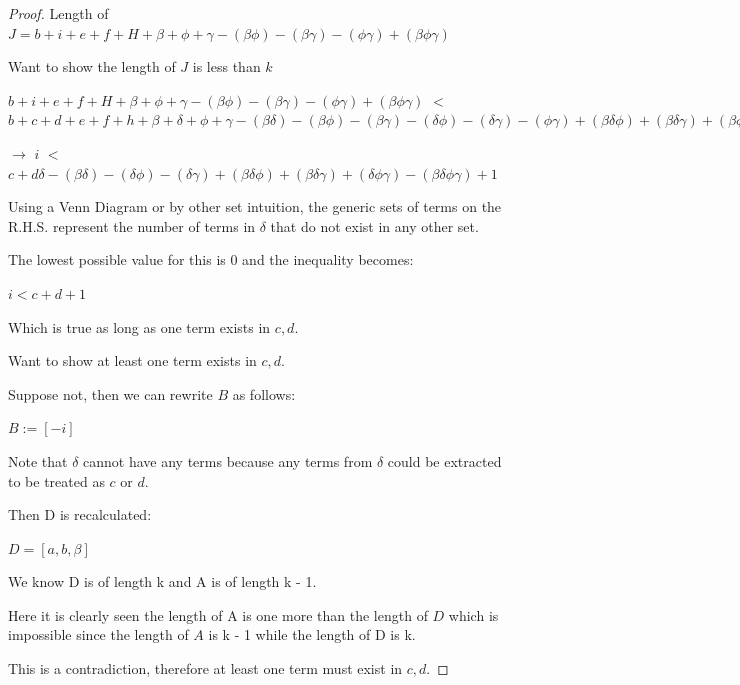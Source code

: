 \documentclass[manuscript]{acmart}
\begin{document}
\begin{proof}
        Length of $J = 
        b + i + e + f + H
        + \beta + \phi + \gamma
        - (\beta \phi) - (\beta \gamma) - (\phi \gamma)
        + (\beta \phi \gamma)
        $

        Want to show the length of $J$ is less than $k$

        $b + i + e + f + H
        + \beta + \phi + \gamma
        - (\beta \phi) - (\beta \gamma) - (\phi \gamma)
        + (\beta \phi \gamma)
        $
        $<$
        $b + c + d + e + f + h
        + \beta + \delta + \phi + \gamma
        - (\beta \delta) - (\beta \phi) - (\beta \gamma) - (\delta \phi) - (\delta \gamma) - (\phi \gamma)
        + (\beta \delta \phi) + (\beta \delta \gamma) + (\beta \phi \gamma) + (\delta \phi \gamma)
        - (\beta \delta \phi \gamma)
        + 1
        $

        $\rightarrow$
        $i
        $
        $<$
        $c + d
        \delta
        - (\beta \delta) - (\delta \phi) - (\delta \gamma)
        + (\beta \delta \phi) + (\beta \delta \gamma) + (\delta \phi \gamma)
        - (\beta \delta \phi \gamma)
        + 1
        $

        Using a Venn Diagram or by other set intuition, the generic sets
        of terms on the R.H.S. represent the number of terms in $\delta$
        that do not exist in any other set.

        The lowest possible value for this is 0 and the inequality becomes:

        $i < c + d + 1$

        Which is true as long as one term exists in {$c, d$}.

        Want to show at least one term exists in {$c, d$}.

        Suppose not, then we can rewrite $B$ as follows:

        $B := [-i]$

        Note that $\delta$ cannot have any terms because any terms from
        $\delta$ could be extracted to be treated as $c$ or $d$.

        Then D is recalculated:

        $D = [a, b, \beta]$

        We know D is of length k and A is of length k - 1.

        Here it is clearly seen the length of A is one more
        than the length of $D$ which is impossible since the 
        length of $A$ is k - 1 while the length of D is k.

        This is a contradiction, therefore at least one term must exist
        in {$c, d$}.


\end{proof}
\end{document}
